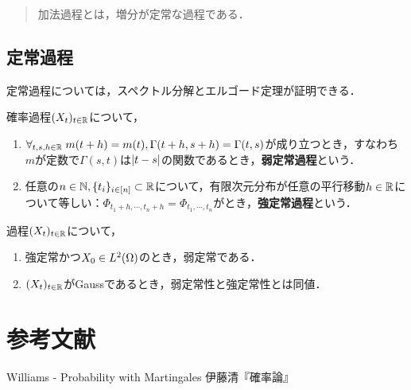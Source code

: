\documentclass[uplatex,dvipdfmx]{jsreport}
\begin{document}
\begin{quotation}
    加法過程とは，増分が定常な過程である．
\end{quotation}

\section{定常過程}

\begin{tcolorbox}[colframe=ForestGreen, colback=ForestGreen!10!white,breakable,colbacktitle=ForestGreen!40!white,coltitle=black,fonttitle=\bfseries\sffamily,
title=]
    定常過程については，スペクトル分解とエルゴード定理が証明できる．
\end{tcolorbox}

\begin{definition}
    確率過程$(X_t)_{t\in\mathbb{R}}$について，
    \begin{enumerate}
        \item $\forall_{t,s,h\in\mathbb{R}}\;m(t+h)=m(t),\Gamma(t+h,s+h)=\Gamma(t,s)$が成り立つとき，すなわち$m$が定数で$\Gamma(s,t)$は$\lvert t-s\rvert$の関数であるとき，\textbf{弱定常過程}という．
        \item 任意の$n\in\mathbb{N},\{t_i\}_{i\in[n]}\subset\mathbb{R}$について，有限次元分布が任意の平行移動$h\in\mathbb{R}$について等しい：$\Phi_{t_1+h,\cdots,t_n+h}=\Phi_{t_1,\cdots,t_n}$がとき，\textbf{強定常過程}という．
    \end{enumerate}
\end{definition}

\begin{lemma}
    過程$(X_t)_{t\in\mathbb{R}}$について，
    \begin{enumerate}
        \item 強定常かつ$X_0\in L^2(\Omega)$のとき，弱定常である．
        \item $(X_t)_{t\in\mathbb{R}}$がGaussであるとき，弱定常性と強定常性とは同値．
    \end{enumerate}
\end{lemma}

\chapter{参考文献}

\begin{thebibliography}{99}
    Williams - Probability with Martingales
    伊藤清『確率論』
\end{thebibliography}
\end{document}
